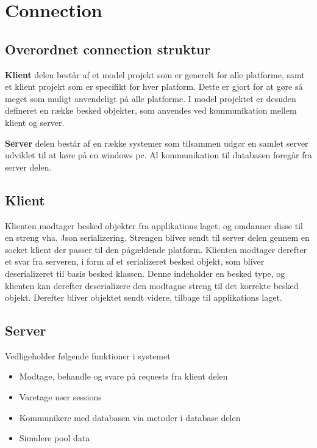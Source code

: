 \section{Connection}

\subsection{Overordnet connection struktur}
\textbf{Klient} delen består af et model projekt som er generelt for alle platforme, samt et klient projekt som er specifikt for hver platform. Dette er gjort for at gøre så meget som muligt anvendeligt på alle platforme. I model projektet er desuden defineret en række besked objekter, som anvendes ved kommunikation mellem klient og server.

\textbf{Server} delen består af en række systemer som tilsammen udgør en samlet server udviklet til at køre på en windows pc. Al kommunikation til databasen foregår fra server delen.

\subsection{Klient}
Klienten modtager besked objekter fra applikations laget, og omdanner disse til en streng vha. Json serializering. Strengen bliver sendt til server delen gennem en socket klient der passer til den pågældende platform.
Klienten modtager derefter et svar fra serveren, i form af et serializeret besked objekt, som bliver deserializeret til basis besked klassen. Denne indeholder en besked type, og klienten kan derefter deserializere den modtagne streng til det korrekte besked objekt. Derefter bliver objektet sendt videre, tilbage til applikations laget. 

\subsection{Server}
Vedligeholder følgende funktioner i systemet
\begin{itemize}
	\item Modtage, behandle og svare på requests fra klient delen
	\item Varetage user sessions
	\item Kommunikere med databasen via metoder i database delen
	\item Simulere pool data
\end{itemize}

